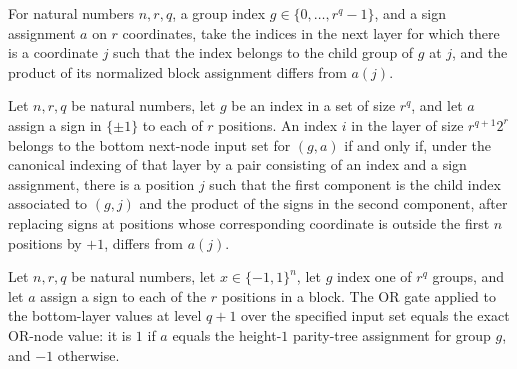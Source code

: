 \begin{definition}
\label{FABL.parityBottomNextNodeInputs}
\leanok
{}
For natural numbers $n,r,q$, a group index $g\in\{0,\ldots,r^q-1\}$, and a sign
assignment $a$ on $r$ coordinates, take the indices in the next layer for which there is
a coordinate $j$ such that the index belongs to the child group of $g$ at $j$, and the
product of its normalized block assignment differs from $a(j)$.
\end{definition}

\begin{theorem}
\label{FABL.mem_parityBottomNextNodeInputs_iff}
\leanok
{}
Let $n,r,q$ be natural numbers, let $g$ be an index in a set of size $r^q$, and let $a$
assign a sign in $\{\pm1\}$ to each of $r$ positions. An index $i$ in the layer of size
$r^{q+1}2^r$ belongs to the bottom next-node input set for $(g,a)$ if and only if, under
the canonical indexing of that layer by a pair consisting of an index and a sign
assignment, there is a position $j$ such that the first component is the child index
associated to $(g,j)$ and the product of the signs in the second component, after
replacing signs at positions whose corresponding coordinate is outside the first $n$
positions by $+1$, differs from $a(j)$.
\end{theorem}

\begin{theorem}
\label{FABL.eval_parityBottomNextNodeInputs}
\leanok
{}
Let $n,r,q$ be natural numbers, let $x\in\{-1,1\}^n$, let $g$ index one of $r^q$ groups,
and let $a$ assign a sign to each of the $r$ positions in a block. The OR gate applied
to the bottom-layer values at level $q+1$ over the specified input set equals the exact
OR-node value: it is $1$ if $a$ equals the height-$1$ parity-tree assignment for group
$g$, and $-1$ otherwise.
\end{theorem}

